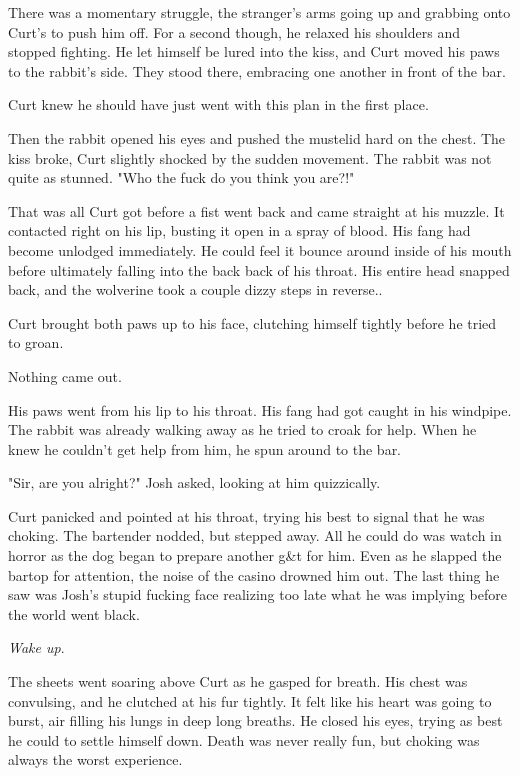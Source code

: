 There was a momentary struggle, the stranger's arms going up and grabbing onto Curt's to push him off. For a second though, he relaxed his shoulders and stopped fighting. He let himself be lured into the kiss, and Curt moved his paws to the rabbit's side. They stood there, embracing one another in front of the bar.

Curt knew he should have just went with this plan in the first place.

Then the rabbit opened his eyes and pushed the mustelid hard on the chest. The kiss broke, Curt slightly shocked by the sudden movement. The rabbit was not quite as stunned. "Who the fuck do you think you are?!"

That was all Curt got before a fist went back and came straight at his muzzle. It contacted right on his lip, busting it open in a spray of blood. His fang had become unlodged immediately. He could feel it bounce around inside of his mouth before ultimately falling into the back back of his throat. His entire head snapped back, and the wolverine took a couple dizzy steps in reverse..

Curt brought both paws up to his face, clutching himself tightly before he tried to groan.

Nothing came out.

His paws went from his lip to his throat. His fang had got caught in his windpipe. The rabbit was already walking away as he tried to croak for help. When he knew he couldn't get help from him, he spun around to the bar.

"Sir, are you alright?" Josh asked, looking at him quizzically.

Curt panicked and pointed at his throat, trying his best to signal that he was choking. The bartender nodded, but stepped away. All he could do was watch in horror as the dog began to prepare another g\&t for him. Even as he slapped the bartop for attention, the noise of the casino drowned him out. The last thing he saw was Josh's stupid fucking face realizing too late what he was implying before the world went black.

\emph{Wake up}.

The sheets went soaring above Curt as he gasped for breath. His chest was convulsing, and he clutched at his fur tightly. It felt like his heart was going to burst, air filling his lungs in deep long breaths. He closed his eyes, trying as best he could to settle himself down. Death was never really fun, but choking was always the worst experience.


